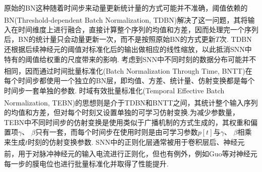 \documentclass[10.5pt,compsoc,UTF8]{CjC}
\theoremstyle{mystyle}
\newcommand{\upcite}[1]{\textsuperscript{\cite{#1}}}
\begin{document}
\begin{multicols}{1}
原始的BN这种随着时间步来动量更新统计量的方式可能并不准确，阈值依赖的BN(Threshold-dependent Batch Normalization, TDBN)\upcite{zheng2020going}解决了这一问题，其将输入在时间维度上进行融合，直接计算整个序列的均值和方差，因而处理完一个序列后，BN的统计量只会动量更新一次，而不是按照原始BN的方式更新$T$次.
TDBN还根据后续神经元的阈值对标准化后的输出做相应的线性缩放，以此抵消SNN中特有的阈值给权重的尺度带来的影响.
考虑到SNN中不同时刻的数据分布可能并不相同，因而通过时间批量标准化(Batch Normalization Through Time, BNTT)\upcite{10.3389/fnins.2021.773954}在每个时间步都使用一个独立的BN层，即均值、方差、统计量、仿射变换都是每个时间步一套单独的参数.
时域有效批量标准化(Temporal Effective Batch Normalization, TEBN)\upcite{duan2022temporal}的思想则是介于TDBN和BNTT之间，其统计整个输入序列的均值和方差，但对每个时刻又设置单独的可学习仿射变换.为减少参数量，TEBN中不同时间步的仿射变换是使用类似于广播机制的方式生成的，其权重和偏置项$\gamma$、 $\beta$只有一套，而每个时间步在使用时则是由可学习参数$p[t]$与$\gamma$、 $\beta$相乘来生成$t$时刻的仿射变换参数.
SNN中的正则化层通常被用于卷积层后、神经元前，用于对脉冲神经元的输入电流进行正则化，但也有例外，例如Guo等\upcite{Guo_2023_ICCV_mpbn}对神经元每一步的膜电位也进行批量标准化并取得了性能提升.


\end{multicols}
\end{document}

